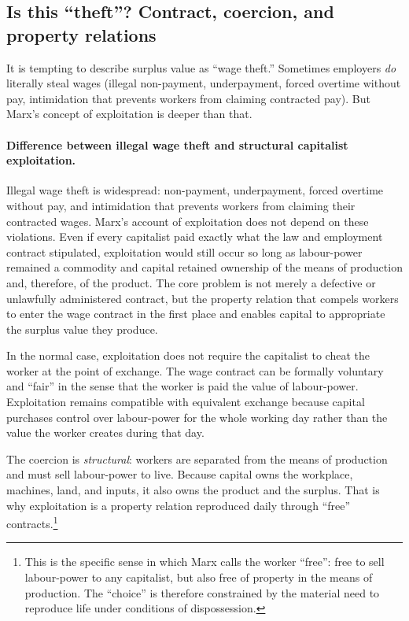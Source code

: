 \subsection{Is this ``theft''? Contract, coercion, and property relations}
\label{sec:theft-or-relation}

It is tempting to describe surplus value as ``wage theft.'' Sometimes employers
\emph{do} literally steal wages (illegal non-payment, underpayment, forced overtime without pay, intimidation that prevents workers from claiming contracted pay). But Marx’s concept of exploitation
is deeper than that.

\paragraph{Difference between illegal wage theft and structural capitalist exploitation.} Illegal wage theft is widespread: non-payment, underpayment, forced overtime without pay, and intimidation that prevents workers from claiming their contracted wages. Marx's account of exploitation does not depend on these violations. Even if every capitalist paid exactly what the law and employment contract stipulated, exploitation would still occur so long as labour-power remained a commodity and capital retained ownership of the means of production and, therefore, of the product. The core problem is not merely a defective or unlawfully administered contract, but the property relation that compels workers to enter the wage contract in the first place and enables capital to appropriate the surplus value they produce.

In the normal case, exploitation does not require the capitalist to cheat the worker
at the point of exchange. The wage contract can be formally voluntary and ``fair'' in the sense that the worker is paid the value of labour-power. Exploitation remains compatible with equivalent exchange because capital purchases
control over labour-power for the whole working day rather than the value the worker
creates during that day.

The coercion is \emph{structural}: workers are separated from the means of production
and must sell labour-power to live. Because capital owns the workplace, machines, land,
and inputs, it also owns the product and the surplus. That is why exploitation is a
property relation reproduced daily through ``free'' contracts.\footnote{This is the specific sense in which Marx calls the worker ``free'': free to sell labour-power to any capitalist, but also free of property in the means of production. The ``choice'' is therefore constrained by the material need to reproduce life under conditions of dispossession.}

